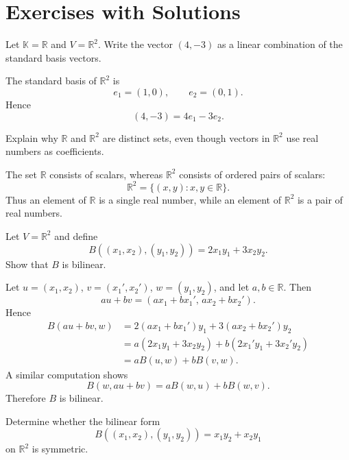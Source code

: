 \documentclass{article}
\begin{document}
	\section{Exercises with Solutions}
	
	\begin{exercise}
		Let $\mathbb{K}=\mathbb{R}$ and $V=\mathbb{R}^2$. Write the vector $(4,-3)$ as a linear combination of the standard basis vectors.
	\end{exercise}
	
	\begin{solution}
		The standard basis of $\mathbb{R}^2$ is
		$$
		e_1=(1,0),\qquad e_2=(0,1).
		$$
		Hence
		$$
		(4,-3)=4e_1-3e_2.
		$$
	\end{solution}
	
	\begin{exercise}
		Explain why $\mathbb{R}$ and $\mathbb{R}^2$ are distinct sets, even though vectors in $\mathbb{R}^2$ use real numbers as coefficients.
	\end{exercise}
	
	\begin{solution}
		The set $\mathbb{R}$ consists of scalars, whereas $\mathbb{R}^2$ consists of ordered pairs of scalars:
		$$
		\mathbb{R}^2=\{(x,y):x,y\in\mathbb{R}\}.
		$$
		Thus an element of $\mathbb{R}$ is a single real number, while an element of $\mathbb{R}^2$ is a pair of real numbers.
	\end{solution}
	
	\begin{exercise}
		Let $V=\mathbb{R}^2$ and define
		$$
		B((x_1,x_2),(y_1,y_2))=2x_1y_1+3x_2y_2.
		$$
		Show that $B$ is bilinear.
	\end{exercise}
	
	\begin{solution}
		Let $u=(x_1,x_2)$, $v=(x_1',x_2')$, $w=(y_1,y_2)$, and let $a,b\in\mathbb{R}$. Then
		$$
		au+bv=(ax_1+bx_1',\,ax_2+bx_2').
		$$
		Hence
		\begin{align*}
			B(au+bv,w)
			&=2(ax_1+bx_1')y_1+3(ax_2+bx_2')y_2\\
			&=a(2x_1y_1+3x_2y_2)+b(2x_1'y_1+3x_2'y_2)\\
			&=aB(u,w)+bB(v,w).
		\end{align*}
		A similar computation shows
		$$
		B(w,au+bv)=aB(w,u)+bB(w,v).
		$$
		Therefore $B$ is bilinear.
	\end{solution}
	
	\begin{exercise}
		Determine whether the bilinear form
		$$
		B((x_1,x_2),(y_1,y_2))=x_1y_2+x_2y_1
		$$
		on $\mathbb{R}^2$ is symmetric.
	\end{exercise}
	
\end{document}
